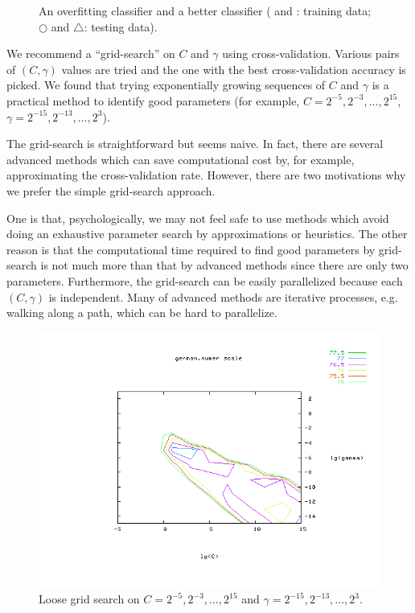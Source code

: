 \documentclass[12pt]{article}
\begin{document}
\begin{figure}[t!]
\begin{center}
\begin{tabular}{cc}
\end{tabular}
\end{center}
\caption{An overfitting classifier and a better classifier
( and : training data; $\bigcirc$ and $\bigtriangleup$: 
testing data).}
\label{over}
\end{figure}

We recommend a ``grid-search'' on $C$ and $\gamma$ using
cross-validation. Various pairs of $(C,\gamma)$ values are tried and
the one with the best cross-validation accuracy is picked. We found
that trying exponentially growing sequences of $C$ and $\gamma$ is a
practical method to identify good parameters (for example,
$C=2^{-5},2^{-3},\ldots,2^{15}$, $\gamma=2^{-15},2^{-13},\ldots,2^3$).

The grid-search is straightforward but seems naive. In fact, there are
several advanced methods which can save computational cost by, for
example, approximating the cross-validation rate. However, there are
two motivations why we prefer the simple grid-search approach.

One is that, psychologically, we may not feel safe to use methods
which avoid doing an exhaustive parameter search by approximations or
heuristics.  The other reason is that the computational time required
to find good parameters by grid-search is not much more than that by
advanced methods since there are only two parameters.  Furthermore,
the grid-search can be easily parallelized because each $(C, \gamma)$
is independent.  Many of advanced methods are iterative processes,
e.g.  walking along a path, which can be hard to parallelize.

\begin{figure}[t!]
\begin{center}
\includegraphics[width=0.75\linewidth,viewport=145 55 625 450,clip]{coarser.png}
\end{center}
\caption{Loose grid search on $C=2^{-5},2^{-3},\ldots,2^{15}$ and 
$\gamma=2^{-15},2^{-13},\ldots,2^{3}.$}
\label{coarser}
\end{figure}
\end{document}
